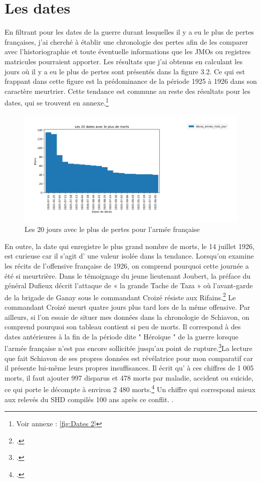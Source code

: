 \section{Les dates}
En filtrant pour les dates de la guerre durant lesquelles il y a eu le plus de pertes françaises, j’ai cherché à établir une chronologie des pertes afin de les comparer avec l’historiographie et toute éventuelle informations que les JMOs ou registres matricules pourraient apporter. Les résultats que j’ai obtenus en calculant les jours où il y a eu  le plus de pertes sont présentés dans la figure 3.2. Ce qui est frappant dans cette figure est la prédominance de la période 1925 à 1926 dans son caractère meurtrier. Cette tendance est commune au reste des résultats pour les dates, qui se trouvent en annexe.\footnote{Voir annexe : \ref{fig:Dates 2}}
\begin{figure}[H]
    \centering
    \includegraphics[scale=0.58]{Images/20dates.jpg}
    \caption{Les 20 jours avec le plus de pertes pour l'armée française}
    \label{fig:Morts par jour}
\end{figure}
En outre, la date qui enregistre le plus grand nombre de morts, le 14 juillet 1926, est curieuse car il s’agit d’ une valeur isolée dans la tendance. Lorsqu’on examine les récits de l’offensive française de 1926, on comprend pourquoi cette journée a été si meurtrière. Dans le témoignage du jeune lieutenant Joubert, la préface du général Dufieux décrit l’attaque de « la grande Tache de Taza » où l’avant-garde de la brigade de Ganay sous le commandant Croizé résiste  aux Rifains.\footcites[7]{joubert1927} Le commandant Croizé meurt quatre jours plus tard lors de la même offensive. Par ailleurs, si l’on essaie  de situer mes données dans la chronologie de Schiavon, on comprend pourquoi son tableau contient si peu de morts. Il correspond à des dates antérieures à la fin de la période dite " Héroïque " de la guerre lorsque l'armée française n'est pas encore sollicitée jusqu'au point de rupture.\footcites[143]{schiavon2016}La lecture que fait Schiavon de ses propres données est révélatrice pour mon comparatif car il présente lui-même leurs propres insuffisances. Il écrit qu’ à ces chiffres de 1 005 morts, il faut ajouter 997 disparus et 478 morts par maladie, accident ou suicide, ce qui porte le décompte à environ 2 480 morts.\footcites[145]{schiavon2016} Un chiffre qui correspond mieux aux relevés du SHD compilés 100 ans après ce conflit. .
